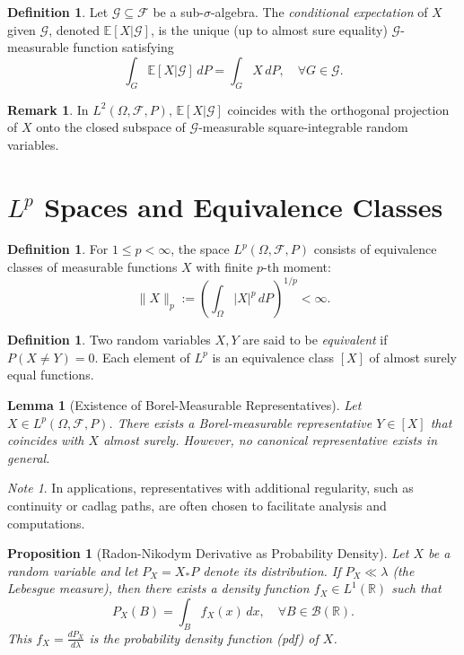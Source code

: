 \documentclass[11pt]{amsart}
\newtheorem{lemma}[theorem]{Lemma}
\newtheorem{proposition}[theorem]{Proposition}
\theoremstyle{definition}
\newtheorem{definition}[theorem]{Definition}
\newtheorem{remark}[theorem]{Remark}
\theoremstyle{remark}
\newtheorem*{note}{Note}
\begin{document}
\begin{definition}
Let $\mathcal{G} \subseteq \mathcal{F}$ be a sub-$\sigma$-algebra. The \emph{conditional expectation} of $X$ given $\mathcal{G}$, denoted $\mathbb{E}[X|\mathcal{G}]$, is the unique (up to almost sure equality) $\mathcal{G}$-measurable function satisfying
\[
\int_G \mathbb{E}[X|\mathcal{G}] \, dP = \int_G X \, dP, \quad \forall G \in \mathcal{G}.
\]
\end{definition}

\begin{remark}
In $L^2(\Omega, \mathcal{F}, P)$, $\mathbb{E}[X|\mathcal{G}]$ coincides with the orthogonal projection of $X$ onto the closed subspace of $\mathcal{G}$-measurable square-integrable random variables.
\end{remark}

\section{\texorpdfstring{$L^p$}{Lp} Spaces and Equivalence Classes}

\begin{definition}
For $1 \leq p < \infty$, the space $L^p(\Omega, \mathcal{F}, P)$ consists of equivalence classes of measurable functions $X$ with finite $p$-th moment:
\[
\|X\|_p := \left( \int_\Omega |X|^p \, dP \right)^{1/p} < \infty.
\]
\end{definition}

\begin{definition}
Two random variables $X, Y$ are said to be \emph{equivalent} if $P(X \neq Y)=0$. Each element of $L^p$ is an equivalence class $[X]$ of almost surely equal functions.
\end{definition}

\begin{lemma}[Existence of Borel-Measurable Representatives]
Let $X \in L^p(\Omega, \mathcal{F}, P)$. There exists a Borel-measurable representative $Y \in [X]$ that coincides with $X$ almost surely. However, no canonical representative exists in general.
\end{lemma}

\begin{note}
In applications, representatives with additional regularity, such as continuity or cadlag paths, are often chosen to facilitate analysis and computations.
\end{note}

\begin{proposition}[Radon-Nikodym Derivative as Probability Density]
Let $X$ be a random variable and let $P_X = X_*P$ denote its distribution. If $P_X \ll \lambda$ (the Lebesgue measure), then there exists a density function $f_X \in L^1(\mathbb{R})$ such that
\[
P_X(B) = \int_B f_X(x) \, dx, \quad \forall B \in \mathcal{B}(\mathbb{R}).
\]
This $f_X = \frac{dP_X}{d\lambda}$ is the \emph{probability density function} (pdf) of $X$.
\end{proposition}
\end{document}
